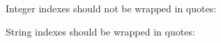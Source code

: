 \documentclass{article}
\begin{document}
\noindent
Integer indexes should not be wrapped in quotes:


\noindent
String indexes should be wrapped in quotes:

\end{document}
